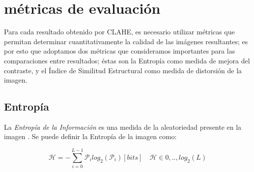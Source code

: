 \documentclass[spanish,twocolumn]{article}
\begin{document}
\section{métricas de evaluación}
\label{sec:metricas}

Para cada resultado obtenido por CLAHE, es necesario utilizar métricas que permitan determinar cuantitativamente la calidad de las imágenes resultantes; es por esto que adoptamos dos métricas que consideramos importantes para las comparaciones entre resultados; éstas son la Entropía como medida de mejora del contraste, y el Índice de Similitud Estructural como medida de distorsión de la imagen.

\subsection{Entropía}
\label{ssec:entropia}

La {\it Entropía de la Información} es una medida de la aleatoriedad presente en la imagen \cite{tsai2008information}. Se puede definir la Entropía de la imagen como: %





\begin{equation}\label{eq:entropia}
\mathscr{H}=-\sum_{i=0}^{L-1}\mathcal{P}_i log_2(\mathcal{P}_i) [bits] \quad \mathscr{H} \in {0,..,log_2(L)} 
\end{equation}
\end{document}
